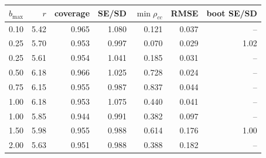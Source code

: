 \begin{tabular}{lrrrrrr}
\toprule
$b_{\max}$ & $r$ & coverage & SE/SD & $\min\rho_{cc}$ & RMSE & boot SE/SD \\
\midrule
0.10 & 5.42 & 0.965 & 1.080 & 0.121 & 0.037 & -- \\
0.25 & 5.70 & 0.953 & 0.997 & 0.070 & 0.029 & 1.02 \\
0.25 & 5.61 & 0.954 & 1.041 & 0.185 & 0.031 & -- \\
0.50 & 6.18 & 0.966 & 1.025 & 0.728 & 0.024 & -- \\
0.75 & 6.15 & 0.955 & 0.987 & 0.837 & 0.044 & -- \\
1.00 & 6.18 & 0.953 & 1.075 & 0.440 & 0.041 & -- \\
1.00 & 5.85 & 0.944 & 0.991 & 0.382 & 0.097 & -- \\
1.50 & 5.98 & 0.955 & 0.988 & 0.614 & 0.176 & 1.00 \\
2.00 & 5.63 & 0.951 & 0.988 & 0.388 & 0.182 & -- \\
\bottomrule
\end{tabular}
